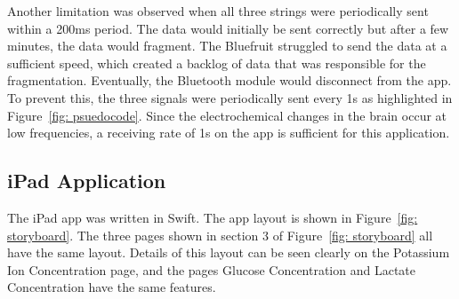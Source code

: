 Another limitation was observed when all three strings were periodically sent within a 200ms period. The data would initially be sent correctly but after a few minutes, the data would fragment. The Bluefruit struggled to send the data at a sufficient speed, which created a backlog of data that was responsible for the fragmentation. Eventually, the Bluetooth module would disconnect from the app. To prevent this, the three signals were periodically sent every 1s as highlighted in Figure~\ref{fig: psuedocode}. Since the electrochemical changes in the brain occur at low frequencies, a receiving rate of 1s on the app is sufficient for this application. 





\subsection{iPad Application}
The iPad app was written in Swift. The app layout is shown in Figure~\ref{fig: storyboard}. The three pages shown in section 3 of Figure~\ref{fig: storyboard} all have the same layout. Details of this layout can be seen clearly on the Potassium Ion Concentration page, and the pages Glucose Concentration and Lactate Concentration have the same features. 

